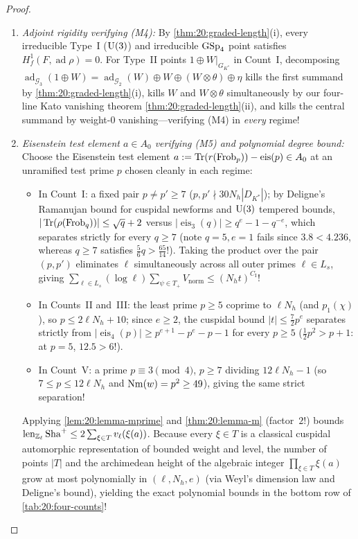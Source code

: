 \begin{proof}
\begin{enumerate}[label=\textup{\arabic*.}]
\begin{itemize}
  \end{itemize}
\item \emph{Adjoint rigidity verifying (M4):} By \cref{thm:20:graded-length}(i), every irreducible Type~I ($\mathrm{U}(3)$) and irreducible $\mathrm{GSp}_4$ point satisfies $H^1_f(F, \operatorname{ad}\rho) = 0$. For Type~II points $1 \oplus W|_{G_{K^*}}$ in Count~I, decomposing $\operatorname{ad}_{\mathcal{G}_3}(1 \oplus W) = \operatorname{ad}_{\mathcal{G}_2}(W) \oplus W \oplus (W \otimes \theta) \oplus \eta$ kills the first summand by \cref{thm:20:graded-length}(i), kills $W$ and $W \otimes \theta$ simultaneously by our four-line Kato vanishing theorem \cref{thm:20:graded-length}(ii), and kills the central summand by weight-$0$ vanishing—verifying (M4) in \emph{every} regime!
\item \emph{Eisenstein test element $a \in A_0$ verifying (M5) and polynomial degree bound:} Choose the Eisenstein test element $a := \operatorname{Tr}(r(\mathrm{Frob}_p)) - \operatorname{eis}(p) \in A_0$ at an unramified test prime $p$ chosen cleanly in each regime:
  \begin{itemize}
  \item In Count~I: a fixed pair $p \neq p' \ge 7$ ($p, p' \nmid 30 N_h |D_{K^*}|$); by Deligne's Ramanujan bound for cuspidal newforms and $\mathrm{U}(3)$ tempered bounds, $|\operatorname{Tr}(\rho(\mathrm{Frob}_q))| \le \sqrt{q} + 2$ versus $|\operatorname{eis}_3(q)| \ge q^e - 1 - q^{-e}$, which separates strictly for every $q \ge 7$ (note $q = 5, e = 1$ fails since $3.8 < 4.236$, whereas $q \ge 7$ satisfies $\frac{5}{6}q > \frac{65}{14}$!). Taking the product over the pair $(p, p')$ eliminates $\ell$ simultaneously across all outer primes $\ell \in L_s$, giving $\sum_{\ell \in L_s} (\log\ell) \sum_{\psi \in T_+} V_{\mathrm{norm}} \le (N_h t)^{C_{\mathrm{I}}}$!
  \item In Counts~II and~III: the least prime $p \ge 5$ coprime to $\ell N_h$ (and $p_1(\chi)$), so $p \le 2\ell N_h + 10$; since $e \ge 2$, the cuspidal bound $|t| \le \frac{7}{2} p^e$ separates strictly from $|\operatorname{eis}_4(p)| \ge p^{e+1} - p^e - p - 1$ for every $p \ge 5$ ($\frac{1}{2} p^2 > p + 1$: at $p = 5$, $12.5 > 6$!).
  \item In Count~V: a prime $p \equiv 3 \pmod 4$, $p \ge 7$ dividing $12\ell N_h - 1$ (so $7 \le p \le 12\ell N_h$ and $\operatorname{Nm}(w) = p^2 \ge 49$), giving the same strict separation!
  \end{itemize}
  Applying \cref{lem:20:lemma-mprime} and \cref{thm:20:lemma-m} (factor~$2$!) bounds $\operatorname{len}_{\mathbb{Z}_\ell}\mathrm{Sha}^+ \le 2\sum_{\xi \in T} v_\ell(\xi(a))$. Because every $\xi \in T$ is a classical cuspidal automorphic representation of bounded weight and level, the number of points $|T|$ and the archimedean height of the algebraic integer $\prod_{\xi \in T} \xi(a)$ grow at most polynomially in $(\ell, N_h, e)$ (via Weyl's dimension law and Deligne's bound), yielding the exact polynomial bounds in the bottom row of \cref{tab:20:four-counts}!
\end{enumerate}


\end{proof}
